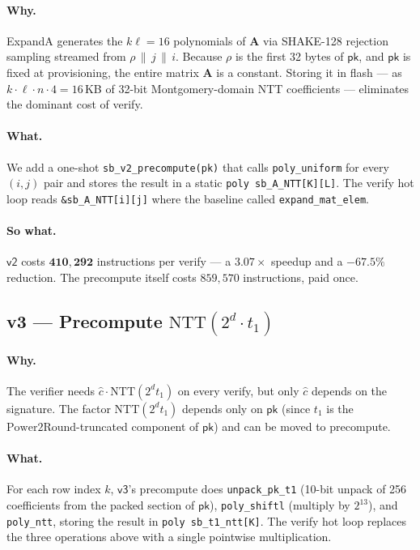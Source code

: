 \documentclass[11pt,a4paper]{article}
\newcommand{\NTT}{\mathrm{NTT}}
\newcommand{\Power}{\mathrm{Power2Round}}
\begin{document}
\paragraph{Why.} ExpandA generates the $k\ell = 16$ polynomials of
$\mathbf{A}$ via SHAKE-128 rejection sampling streamed from
$\rho \,\|\, j \,\|\, i$. Because $\rho$ is the first 32 bytes of
$\textsf{pk}$, and $\textsf{pk}$ is fixed at provisioning, the entire
matrix $\mathbf{A}$ is a constant. Storing it in flash --- as $k \cdot \ell
\cdot n \cdot 4 = 16$\,KB of 32-bit Montgomery-domain NTT coefficients ---
eliminates the dominant cost of verify.

\paragraph{What.} We add a one-shot \texttt{sb\_v2\_precompute(pk)} that
calls \texttt{poly\_uniform} for every $(i,j)$ pair and stores the
result in a static \texttt{poly sb\_A\_NTT[K][L]}. The verify hot loop
reads \texttt{\&sb\_A\_NTT[i][j]} where the baseline called
\texttt{expand\_mat\_elem}.

\paragraph{So what.} $\textsf{v2}$ costs $\mathbf{410{,}292}$ instructions
per verify --- a $\mathbf{3.07\times}$ speedup and a $\mathbf{-67.5\%}$
reduction. The precompute itself costs $859{,}570$ instructions, paid
once.

\subsection{v3 --- Precompute \texorpdfstring{$\NTT(2^d \cdot t_1)$}{NTT(2^d * t1)}}

\paragraph{Why.} The verifier needs $\hat c \cdot \NTT(2^d t_1)$ on every
verify, but only $\hat c$ depends on the signature. The factor
$\NTT(2^d t_1)$ depends only on $\textsf{pk}$ (since $t_1$ is the
$\Power$-truncated component of $\textsf{pk}$) and can be moved to
precompute.

\paragraph{What.} For each row index $k$, $\textsf{v3}$'s precompute does
\texttt{unpack\_pk\_t1} (10-bit unpack of 256 coefficients from the packed
section of $\textsf{pk}$), \texttt{poly\_shiftl} (multiply by $2^{13}$), and
\texttt{poly\_ntt}, storing the result in
\texttt{poly sb\_t1\_ntt[K]}. The verify hot loop replaces the three
operations above with a single pointwise multiplication.
\end{document}
